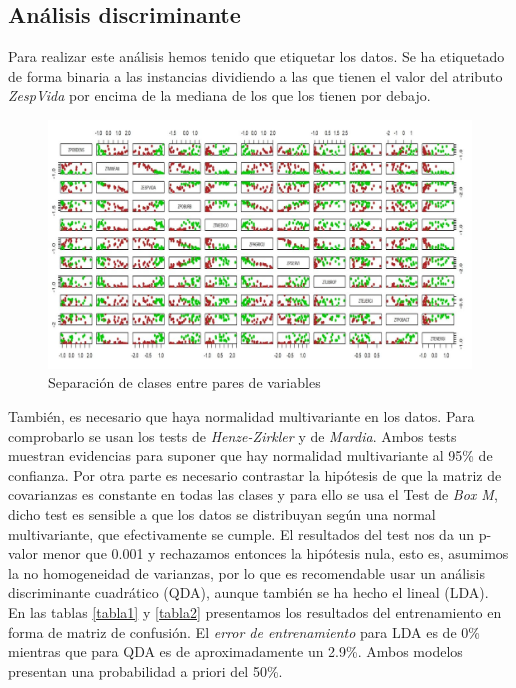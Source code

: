 \documentclass[11pt,a4paper]{article}
\begin{document}
    
    \subsection{Análisis discriminante}

    	Para realizar este análisis hemos tenido que etiquetar los datos. Se ha etiquetado de forma binaria a las instancias dividiendo a las que tienen el valor del atributo \textit{ZespVida} por encima de la mediana de los que los tienen por debajo. \\

        \begin{figure}[H]
            \centering
            \includegraphics[scale = 1]{img7.jpg}
            \caption{Separación de clases entre pares de variables}
            \label{fig:my_label}
        \end{figure}

    	También, es necesario que haya normalidad multivariante en los datos. Para comprobarlo se usan los tests de  \textit{Henze-Zirkler} y de \textit{Mardia}. Ambos tests muestran evidencias para suponer que hay normalidad multivariante al 95\% de confianza. Por otra parte es necesario contrastar la hipótesis de que la matriz de covarianzas es constante en todas las clases y para ello se usa el Test de \textit{Box M}, dicho test es sensible a que los datos se distribuyan según una normal multivariante, que efectivamente se cumple. El resultados del test nos da un p-valor menor que 0.001 y rechazamos entonces la hipótesis nula, esto es, asumimos la no homogeneidad de varianzas, por lo que es recomendable usar un análisis discriminante cuadrático (QDA), aunque también se ha hecho el lineal (LDA).\\ 
    	
        En las tablas \ref{tabla1} y \ref{tabla2} presentamos los resultados del entrenamiento en forma de matriz de confusión. El \textit{error de entrenamiento} para LDA es de 0\% mientras que para QDA es de aproximadamente un 2.9\%. Ambos modelos presentan una probabilidad a priori del 50\%. 
    	
\end{document}
